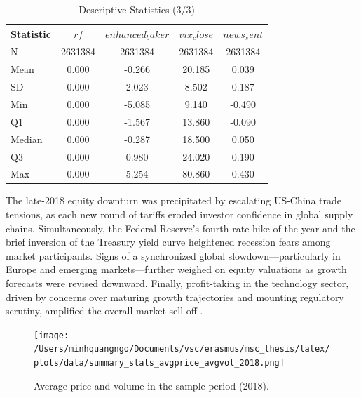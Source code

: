 \begin{table}[ht]
\centering
\caption{Descriptive Statistics (3/3)}
\label{tab:descr_stats3}

\begin{tabular}{lcccc}
\toprule
Statistic & $rf$ & $enhanced_baker$ & $vix_close$ & $news_sent$ \\\midrule
N & 2631384 & 2631384 & 2631384 & 2631384 \\
Mean & 0.000 & -0.266 & 20.185 & 0.039 \\
SD & 0.000 & 2.023 & 8.502 & 0.187 \\
Min & 0.000 & -5.085 & 9.140 & -0.490 \\
Q1 & 0.000 & -1.567 & 13.860 & -0.090 \\
Median & 0.000 & -0.287 & 18.500 & 0.050 \\
Q3 & 0.000 & 0.980 & 24.020 & 0.190 \\
Max & 0.000 & 5.254 & 80.860 & 0.430 \\
\bottomrule
\end{tabular}
\end{table}

The late-2018 equity downturn was precipitated by escalating US-China trade tensions, as each new round of tariffs eroded investor confidence in global supply chains. Simultaneously, the Federal Reserve's fourth rate hike of the year and the brief inversion of the Treasury yield curve heightened recession fears among market participants. Signs of a synchronized global slowdown—particularly in Europe and emerging markets—further weighed on equity valuations as growth forecasts were revised downward. Finally, profit-taking in the technology sector, driven by concerns over maturing growth trajectories and mounting regulatory scrutiny, amplified the overall market sell-off \cite{reuters_2018}.

\begin{figure}[H]
     \centering
     \texttt{[image: /Users/minhquangngo/Documents/vsc/erasmus/msc\_thesis/latex/plots/data/summary\_stats\_avgprice\_avgvol\_2018.png]}
     \caption{Average price and volume in the sample period (2018).}
     \label{fig:avgprice_avgvol_2018}
 \end{figure}


